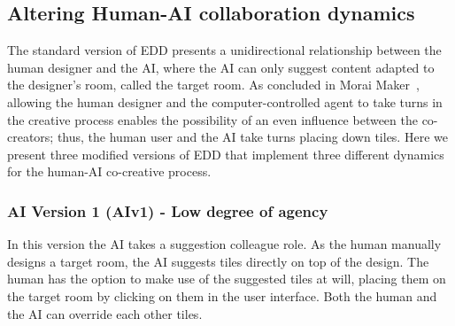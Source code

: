 \subsection{Altering Human-AI collaboration dynamics}



The standard version of EDD presents a unidirectional relationship between the human designer and the AI, where the AI can only suggest content adapted to the designer's room, called the target room. As concluded in Morai Maker~, allowing the human designer and the computer-controlled agent to take turns in the creative process enables the possibility of an even influence between the co-creators; thus, the human user and the AI take turns placing down tiles. Here we present three modified versions of EDD that implement three different dynamics for the human-AI co-creative process. %





\subsubsection{AI Version 1 (AIv1) - Low degree of agency} 

In this version the AI takes a suggestion colleague role. As the human manually designs a target room, the AI suggests tiles directly on top of the design. The human has the option to make use of the suggested tiles at will, placing them on the target room by clicking on them in the user interface. Both the human and the AI can override each other tiles.


